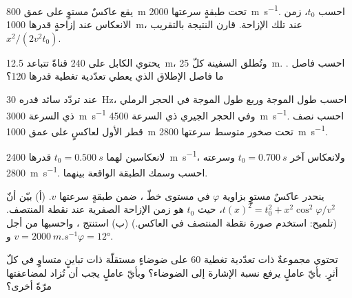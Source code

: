 \begin{exercise}[$\star$]\label{exo:b3:exploration-seismology:2}
يقع عاكسٌ مستوٍ على عمق \qty{800}{m} تحت طبقةٍ سرعتها \qty{2000}{m.s^{-1}}.
احسب $t_0$، زمن الانعكاس عند إزاحةٍ قدرها \qty{1000}{m}، 
عند تلك الإزاحة. قارن النتيجة بالتقريب $x^2/(2v^2t_0)$.
\end{exercise}

\begin{exercise}[$\star$]\label{exo:b3:exploration-seismology:3}
يحتوي الكابل على 240 قناةً تتباعد \qty{12.5}{m}، وتُطلق السفينة كلّ
\qty{25}{m}. احسب فاصل  . ما فاصل الإطلاق الذي
يعطي تعدّدية تغطية قدرها 120؟
\end{exercise}

\begin{exercise}[$\star$]\label{exo:b3:exploration-seismology:4}
عند تردّد سائد قدره \qty{30}{Hz}، احسب طول الموجة
وربع طول الموجة في الحجر الرملي ذي السرعة \qty{3000}{m.s^{-1}} وفي الحجر الجيري ذي
السرعة \qty{4500}{m.s^{-1}}. احسب نصف قطر  الأول لعاكسٍ على
عمق \qty{1000}{m} تحت صخور متوسط سرعتها \qty{2800}{m.s^{-1}}.
\end{exercise}

\begin{exercise}[$\star\star$]\label{exo:b3:exploration-seismology:5}
لانعكاسين لهما $t_0 = \qty{0.500}{s}$  قدرها
\qty{2400}{m.s^{-1}}، ولانعكاس آخر $t_0 = \qty{0.700}{s}$ وسرعته \qty{2800}{m.s^{-1}}.
احسب  وسمك الطبقة الواقعة بينهما.
\end{exercise}

\begin{exercise}[$\star\star$]\label{exo:b3:exploration-seismology:6}
ينحدر عاكسٌ مستوٍ بزاوية $\varphi$ في مستوى خطّ ، ضمن طبقةٍ
سرعتها $v$. (أ) بيّن أنّ $t(x)^2 = t_0^2 + x^2\cos^2\varphi/v^2$، حيث $t_0$ هو
زمن الإزاحة الصفرية عند نقطة المنتصف. (تلميح: استخدم صورة نقطة المنتصف في
العاكس.) (ب) استنتج ، واحسبها من أجل
$v = \qty{2000}{m.s^{-1}}$ و$\varphi = \ang{12}$.
\end{exercise}

\begin{exercise}[$\star\star$]\label{exo:b3:exploration-seismology:7}
تحتوي مجموعةٌ ذات تعدّدية تغطية 60 على ضوضاءٍ مستقلّة ذات تباينٍ متساوٍ في كلّ أثرٍ. بأيّ عاملٍ
يرفع  نسبة الإشارة إلى الضوضاء؟ وبأيّ عاملٍ يجب أن تُزاد
 لمضاعفتها مرّةً أخرى؟
\end{exercise}

